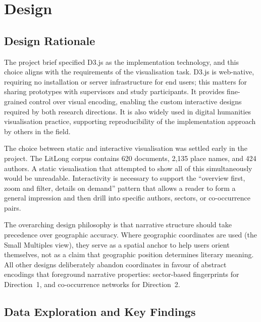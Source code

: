 \documentclass[logo,msc]{infthesis}
\begin{document}
 
\chapter{Design}
\label{chap:design}
 
\section{Design Rationale}
 
The project brief specified D3.js \cite{bostock2011} as the implementation technology, and this choice aligns with the requirements of the visualisation task. D3.js is web-native, requiring no installation or server infrastructure for end users; this matters for sharing prototypes with supervisors and study participants. It provides fine-grained control over visual encoding, enabling the custom interactive designs required by both research directions. It is also widely used in digital humanities visualisation practice, supporting reproducibility of the implementation approach by others in the field.
 
The choice between static and interactive visualisation was settled early in the project. The LitLong corpus contains 620 documents, 2,135 place names, and 424 authors. A static visualisation that attempted to show all of this simultaneously would be unreadable. Interactivity is necessary to support the ``overview first, zoom and filter, details on demand'' pattern \cite{shneiderman1996} that allows a reader to form a general impression and then drill into specific authors, sectors, or co-occurrence pairs.
 
The overarching design philosophy is that narrative structure should take precedence over geographic accuracy. Where geographic coordinates are used (the Small Multiples view), they serve as a spatial anchor to help users orient themselves, not as a claim that geographic position determines literary meaning. All other designs deliberately abandon coordinates in favour of abstract encodings that foreground narrative properties: sector-based fingerprints for Direction~1, and co-occurrence networks for Direction~2.
 
\section{Data Exploration and Key Findings}
\label{sec:dataexploration}
 
\end{document}
